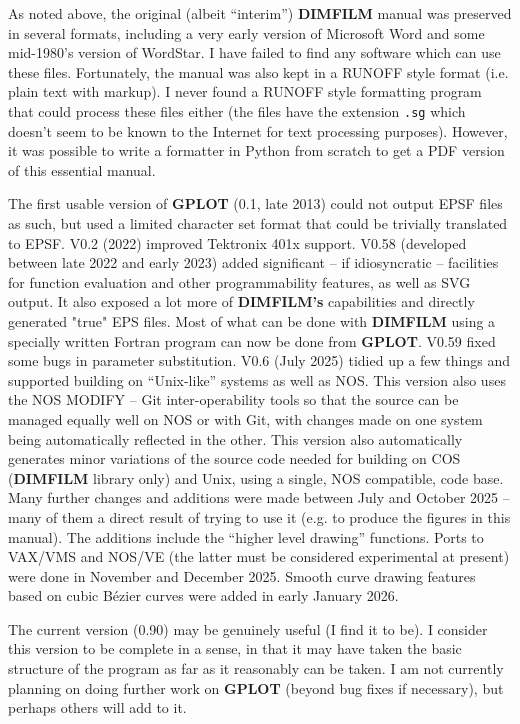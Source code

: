 \documentclass[a4paper,twoside,11pt]{article}
\newcommand{\newpara}{\par\vspace{4mm}\noindent}
\begin{document}
\newpara
As noted above,
the original (albeit ``interim'') \textbf{DIMFILM} manual was preserved in several formats, including a very early version
of Microsoft Word and some mid-1980's version of WordStar. I have failed to find any software which can use these
files. Fortunately, the manual was also kept in a RUNOFF style format (i.e. plain text with markup). I never found
a RUNOFF style formatting program that could process these files either (the files have the extension \texttt{.sg} which
doesn't seem to be known to the Internet for text processing purposes). However, it was possible to write a
formatter in Python from scratch to get a PDF version of this essential manual.

\newpara
The first usable version of \textbf{GPLOT} (0.1, late 2013) 
could not output EPSF files as such, but used a
limited character set format that could be trivially translated to EPSF. V0.2 (2022) improved Tektronix 401x support. V0.58
(developed between late 2022 and early 2023) added significant -- if idiosyncratic -- facilities for function evaluation 
and other programmability features, as well as SVG output. It also exposed a lot more of \textbf{DIMFILM's} capabilities and directly
generated "true" EPS files. Most of what can be done with \textbf{DIMFILM} using a specially
written Fortran program can now be done from \textbf{GPLOT}. V0.59 fixed some bugs in parameter substitution. V0.6 (July 2025)
tidied up a few things and supported building on ``Unix-like'' systems as well as NOS. This version also uses the NOS MODIFY --
Git inter-operability tools so that the source can be managed equally well on NOS or with Git, with changes made on one system
being automatically reflected in the other. This version also automatically generates minor variations of the source code
needed for building on COS (\textbf{DIMFILM} library only) and Unix, using a single, NOS compatible,
code base. Many further changes and additions were made
between July and October 2025 -- many of them a direct result of trying to use it (e.g. to produce the figures
in this manual). The additions include the ``higher level drawing'' functions.
Ports to VAX/VMS and NOS/VE (the latter must be considered experimental at present) were done in November and December 2025.
Smooth curve drawing features based on cubic B\'{e}zier curves were added in early January 2026.

\newpara
The current version (0.90) may be genuinely useful (I find it to be).
I consider this version to be complete in a sense, in that it may have taken the basic structure of the program as
far as it reasonably can be taken. I am not currently planning on doing further work on \textbf{GPLOT} (beyond bug fixes if
necessary), but perhaps others will add to it.
\end{document}
